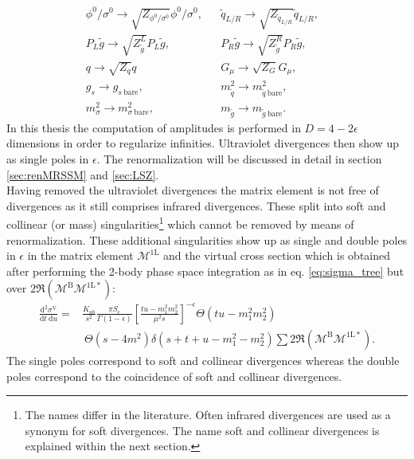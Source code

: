 \begin{align}
& \phi^0 / \sigma^0 \to \sqrt{Z_{\phi^0 / \sigma^0}}\phi^0 / \sigma^0, && \tilde{q}_{L/R} \to \sqrt{Z_{\tilde{q}_{L/R}}}\tilde{q}_{L/R}, \nonumber\\
& P_L \tilde{g} \to \sqrt{Z_{\tilde{g}}^L} P_L \tilde{g}, && P_R \tilde{g} \to \sqrt{Z_{\tilde{g}}^R} P_R \tilde{g},\nonumber\\
& q \to \sqrt{Z_q}q && G_\mu \to \sqrt{Z_G} G_\mu, && \label{eq:fieldtrafo}\\
& g_s \to g_{s\ \mathrm{bare}}, && m_{\tilde{q}}^2 \to m_{\tilde{q}\ \mathrm{bare}}^2, \nonumber\\
&  m_{\sigma}^2 \to m_{\sigma\ \mathrm{bare}}^2, && m_{\tilde{g}} \to m_{\tilde{g}\ \mathrm{bare}}.\label{eq:parametertrafo}
\end{align}
In this thesis the computation of amplitudes is performed in $D = 4-2\epsilon$ dimensions in order to regularize infinities. Ultraviolet divergences then show up as single poles in $\epsilon$. The renormalization will be discussed in detail in section \ref{sec:renMRSSM} and \ref{sec:LSZ}.\\
Having removed the ultraviolet divergences the matrix element is not free of divergences as it still comprises infrared divergences. These split into soft and collinear (or mass) singularities\footnote{The names differ in the literature. Often infrared divergences are used as a synonym for soft divergences. The name soft and collinear divergences is explained within the next section.} which cannot be removed by means of renormalization. These additional singularities show up as single and double poles in $\epsilon$ in the matrix element $\mathcal{M^{\mathrm{1L}}}$ and the virtual cross section which is obtained after performing the 2-body phase space integration as in eq. \eqref{eq:sigma_tree} but over $2 \Re \left( \mathcal{M}^{\mathrm{B}} \mathcal{M}^{\mathrm{1L}\ast} \right)$:
\begin{align}
\frac{\mbox{d}^2 \sigma^{\mathrm{V}}}{\mbox{d}t\ \mbox{d}u} =& \frac{K_{ab}}{s^2} \frac{\pi S_{\epsilon}}{\Gamma(1-\epsilon)} \left[ \frac{tu-m_1^2m_2^2}{\mu^2 s}\right]^{-\epsilon} \Theta(tu-m_1^2m_2^2)\nonumber\\
&\ \Theta(s-4m^2) \delta(s+t+u-m_1^2-m_2^2) \sum 2 \Re \left( \mathcal{M}^{\mathrm{B}} \mathcal{M}^{\mathrm{1L}\ast} \right).\label{eq:diffsigma}
\end{align}
The single poles correspond to soft and collinear divergences whereas the double poles correspond to the coincidence of soft and collinear divergences.


